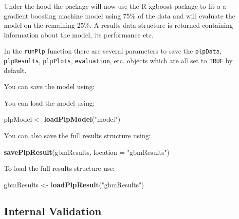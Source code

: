 \documentclass[11pt]{book}
\newenvironment{Shaded}{\begin{snugshade}}{\end{snugshade}}
\newcommand{\KeywordTok}[1]{\textcolor[rgb]{0.13,0.29,0.53}{\textbf{#1}}}
\newcommand{\DataTypeTok}[1]{\textcolor[rgb]{0.13,0.29,0.53}{#1}}
\newcommand{\StringTok}[1]{\textcolor[rgb]{0.31,0.60,0.02}{#1}}
\newcommand{\OperatorTok}[1]{\textcolor[rgb]{0.81,0.36,0.00}{\textbf{#1}}}
\newcommand{\NormalTok}[1]{#1}
\begin{document}
Under the hood the package will now use the R xgboost package to fit a a
gradient boosting machine model using 75\% of the data and will evaluate
the model on the remaining 25\%. A results data structure is returned
containing information about the model, its performance etc.

In the \texttt{runPlp} function there are several parameters to save the
\texttt{plpData}, \texttt{plpResults}, \texttt{plpPlots},
\texttt{evaluation}, etc. objects which are all set to \texttt{TRUE} by
default.

You can save the model using:

\begin{Shaded}
\end{Shaded}

You can load the model using:

\begin{Shaded}
\begin{Highlighting}[]
\NormalTok{plpModel <-}\StringTok{ }\KeywordTok{loadPlpModel}\NormalTok{(}\StringTok{"model"}\NormalTok{)}
\end{Highlighting}
\end{Shaded}

You can also save the full results structure using:

\begin{Shaded}
\begin{Highlighting}[]
\KeywordTok{savePlpResult}\NormalTok{(gbmResults, }\DataTypeTok{location =} \StringTok{"gbmResults"}\NormalTok{)}
\end{Highlighting}
\end{Shaded}

To load the full results structure use:

\begin{Shaded}
\begin{Highlighting}[]
\NormalTok{gbmResults <-}\StringTok{ }\KeywordTok{loadPlpResult}\NormalTok{(}\StringTok{"gbmResults"}\NormalTok{)}
\end{Highlighting}
\end{Shaded}

\subsection{Internal Validation}\label{internal-validation}
\end{document}
